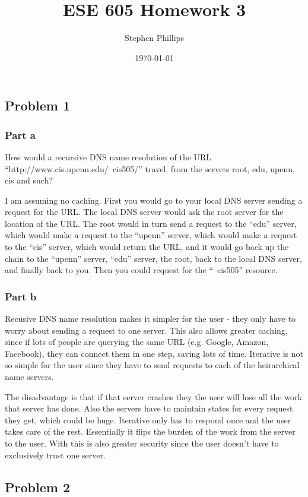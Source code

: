\documentclass[english]{article}
\title{ESE 605 Homework 3}
\author{Stephen Phillips}
\date{\today }
\begin{document}
\maketitle
\subsection*{Problem 1}
\subsubsection*{Part a}
How would a recursive DNS name resolution of the URL ``http://www.cis.upenn.edu/~cis505/'' travel, from the servers
root, edu, upenn, cis and such?

I am assuming no caching. First you would go to your local DNS server sending a request for the URL. The local
DNS server would ask the root server for the location of the URL. The root would in turn send a request to the
``edu'' server, which would make a request to the ``upenn'' server, which would make a request to the ``cis'' server,
which would return the URL, and it would go back up the chain to the ``upenn'' server, ``edu'' server, the root,
back to the local DNS server, and finally back to you. Then you could request for the ``~cis505'' resource.

\subsubsection*{Part b}
Recusive DNS name resolution makes it simpler for the user - they only have to worry about sending a request to one
server. This also allows greater caching, since if lots of people are querying the same URL (e.g. Google, Amazon,
Facebook), they can connect them in one step, saving lots of time. Iterative is not so simple for the user since they
have to send requests to each of the heirarchical name servers. 

The disadvantage is that if that server crashes they the user will lose all the work that server has done. Also the
servers have to maintain states for every request they get, which could be huge. Iterative only has to respond once
and the user takes care of the rest. Essentially it flips the burden of the work from the server to the user. With
this is also greater security since the user doesn't have to exclusively trust one server. 

\subsection*{Problem 2}
\end{document}

